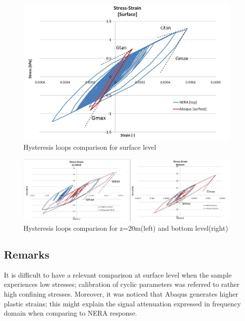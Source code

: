 	\begin{figure}[h!]
		\centering
		\includegraphics[width=0.7\linewidth]{"tau_gamma1"}
		\caption{Hysteresis loops comparison for surface level}
		\label{tau_gamma1}
	\end{figure}
	
	\begin{figure}[h!]
		\centering
		\includegraphics[width=0.9\linewidth]{"tau_gamma2"}
		\caption{Hysteresis loops comparison for z=20m(left) and bottom level(right)}
		\label{tau_gamma2}
	\end{figure}
	
	\subsection{Remarks}
	It is difficult to have a relevant comparison at surface level when the sample experiences low stresses; calibration of cyclic parameters was referred to rather high confining stresses. Moreover, it was noticed that Abaqus generates higher plastic strains; this might explain the signal attenuation expressed in frequency domain when comparing to NERA response. 
	
